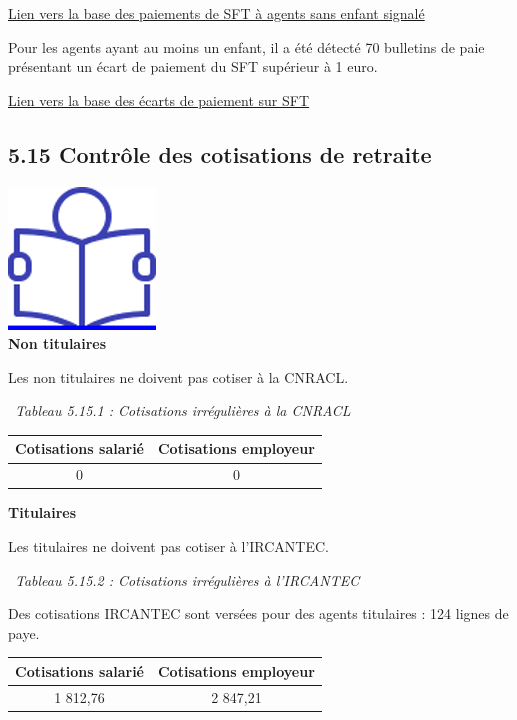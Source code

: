 \href{../Bases/Reglementation/Paie.sans.enfant.reduit.csv}{Lien vers la
base des paiements de SFT à agents sans enfant signalé}

Pour les agents ayant au moins un enfant, il a été détecté 70 bulletins
de paie présentant un écart de paiement du SFT supérieur à 1 euro.

\href{../Bases/Reglementation/controle.sft.csv}{Lien vers la base des
écarts de paiement sur SFT}

\hypertarget{controle-des-cotisations-de-retraite}{%
\subsection{5.15 Contrôle des cotisations de
retraite}\label{controle-des-cotisations-de-retraite}}

\href{../Docs/Notices/fiche_retraite.odt}{\includegraphics{icones/Notice.png}}\\
\textbf{Non titulaires}

Les non titulaires ne doivent pas cotiser à la CNRACL.

~\emph{Tableau 5.15.1 : Cotisations irrégulières à la CNRACL}

\begin{longtable}[]{@{}cc@{}}
\toprule
Cotisations salarié & Cotisations employeur\tabularnewline
\midrule
\endhead
0 & 0\tabularnewline
\bottomrule
\end{longtable}

\textbf{Titulaires}

Les titulaires ne doivent pas cotiser à l'IRCANTEC.

~\emph{Tableau 5.15.2 : Cotisations irrégulières à l'IRCANTEC}

Des cotisations IRCANTEC sont versées pour des agents titulaires : 124
lignes de paye.

\begin{longtable}[]{@{}cc@{}}
\toprule
Cotisations salarié & Cotisations employeur\tabularnewline
\midrule
\endhead
1 812,76 & 2 847,21\tabularnewline
\bottomrule
\end{longtable}

